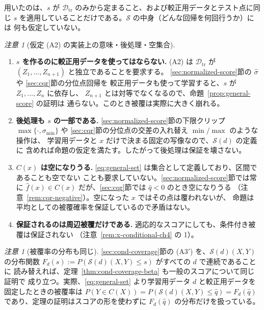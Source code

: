 \documentclass[a4paper,11pt]{jsarticle}
\theoremstyle{definition}
\theoremstyle{plain}
\theoremstyle{remark}
\newtheorem{remark}[definition]{注意}
\newcommand{\Dtr}{\mathcal{D}_{\mathrm{tr}}}     %
\newcommand{\qhat}{\hat{q}}
\newcommand{\fhat}{\hat{f}}
\begin{document}
用いたのは、$s$ が $\Dtr$ のみから定まること、および較正用データとテスト点に同じ $s$
を適用していることだけである。$\mathcal{S}$ の中身（どんな回帰を何回行うか）には
何も仮定していない。

\begin{remark}[仮定 (A2) の実装上の意味・後処理・空集合]
  \label{rem:general-score}
  \leavevmode
  \begin{enumerate}
    \item \textbf{$s$ を作るのに較正用データを使ってはならない.}
      (A2) は $\Dtr$ が $(Z_1,\dots,Z_{n+1})$ と独立であることを要求する。
      \ref{sec:normalized-score}節の $\hat\sigma$ や \ref{sec:cqr}節の分位点回帰を
      較正用データも使って学習すると、$s$ が $Z_1,\dots,Z_n$ に依存し、
      $Z_{n+1}$ とは対等でなくなるので、命題~\ref{prop:general-score} の証明は
      通らない。このとき被覆は実際に大きく崩れる。
    \item \textbf{後処理も $s$ の一部である.}
      \ref{sec:normalized-score}節の下限クリップ $\max\{\cdot,\sigma_{\min}\}$ や
      \ref{sec:cqr}節の分位点の交差の入れ替え $\min/\max$ のような操作は、
      学習用データと $x$ だけで決まる固定の写像なので、$\mathcal{S}(d)$ の定義に
      含めれば命題の仮定を満たす。したがって後処理は保証を壊さない。
    \item \textbf{$C(x)$ は空になりうる.}
      \eqref{eq:general-set} は集合として定義しており、区間であることも空でない
      ことも要求していない。\ref{sec:normalized-score}節では常に $\fhat(x)\in C(x)$
      だが、\ref{sec:cqr}節では $\qhat<0$ のとき空になりうる
      （注意~\ref{rem:cqr-negative}）。空になった $x$ ではその点は覆われないが、
      命題は平均としての被覆確率を保証しているので矛盾はない。
    \item \textbf{保証されるのは周辺被覆だけである.}
      適応的なスコアにしても、条件付き被覆は保証されない
      （注意~\ref{rem:x-conditional-ch4} の 1）。
  \end{enumerate}
\end{remark}

\begin{remark}[被覆率の分布も同じ]
  \label{rem:general-score-beta}
  \ref{sec:cond-coverage}節の (A3$'$) を、$\mathcal{S}(d)(X,Y)$ の分布関数
  $F_d(s):=P(\mathcal{S}(d)(X,Y)\le s)$ がすべての $d$ で連続であることに
  読み替えれば、定理~\ref{thm:cond-coverage-beta} も一般のスコアについて同じ証明で
  成り立つ。実際、\eqref{eq:general-set} より学習用データ $d$ と較正用データを
  固定したときの被覆率は $P(Y\in C(X))=P(\mathcal{S}(d)(X,Y)\le\qhat)=F_d(\qhat)$
  であり、定理の証明はスコアの形を使わずに $F_d(\qhat)$ の分布だけを扱っている。
\end{remark}
\end{document}
